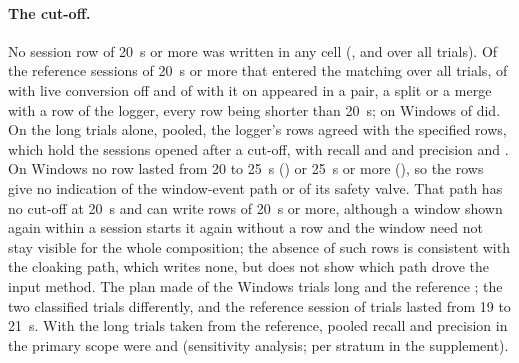 \paragraph{The cut-off.} No session row of 20~s or more was written in any cell
(,  and
 over all trials). Of the reference sessions of 20~s or more that entered
the matching over all trials,  of
 with live conversion off and
 of  with it on appeared in
a pair, a split or a merge with a row of the logger, every row being shorter than 20~s; on Windows
 of  did. On the long trials alone,
pooled, the logger's rows agreed with the specified rows, which hold the sessions opened after a cut-off, with recall
 and
 and precision
 and
. On Windows no row lasted from 20 to 25~s
() or 25~s or more (), so the
rows give no indication of the window-event path or of its safety valve. That path has no cut-off at 20~s and can write
rows of 20~s or more, although a window shown again within a session starts it again without a row and the window need
not stay visible for the whole composition; the absence of such rows is consistent with the cloaking path, which writes
none, but does not show which path drove the input method. The plan made 
of the  Windows trials long and the reference
; the two classified  trials differently,
and the reference session of  trials lasted from 19 to 21~s. With the long trials
taken from the reference, pooled recall and precision in the primary scope were
 and
 (sensitivity analysis; per stratum in the
supplement).

